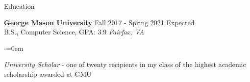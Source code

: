 \documentclass{resume} %
\begin{document}

\begin{rSection}{Education}
  
{\bf George Mason University} \hfill {Fall 2017 - Spring 2021 Expected}
\\ 
B.S., Computer Science, GPA: 3.9 \hfill {\it Fairfax, VA}

\begin{list}{$\cdot$}{\leftmargin=0em}
  \vspace{-0.5em}
    \item \emph{University Scholar} - one of twenty recipients in my class of the highest academic scholarship awarded at GMU
\end{list}

\end{rSection}

\end{document}
